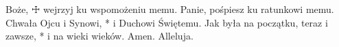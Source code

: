 \rubric{\Vbar} Boże, ☩ wejrzyj ku wspomożeniu memu.
\rubric{\Rbar} Panie, pośpiesz ku ratunkowi memu.
\rubric{\Vbar} Chwała Ojcu i Synowi, * i Duchowi Świętemu.
\rubric{\Rbar} Jak była na początku, teraz i zawsze, * i na wieki wieków. Amen.
Alleluja.